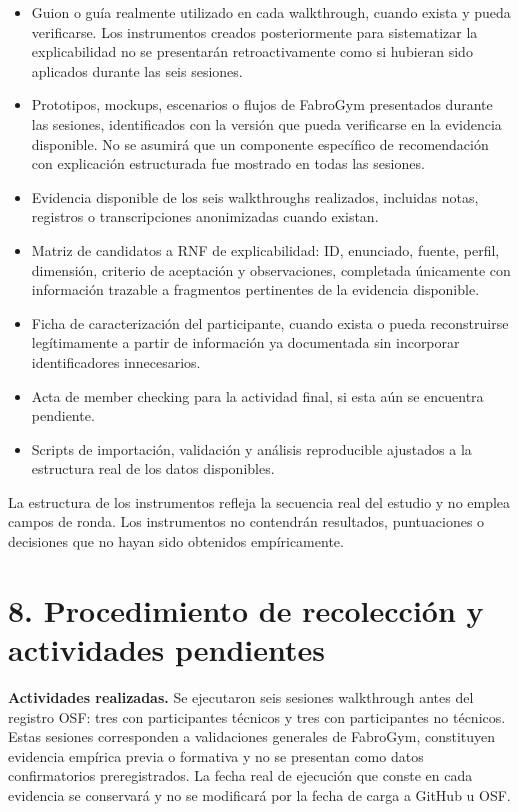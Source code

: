 \documentclass[9pt,a4paper]{extarticle}
\begin{document}
\begin{itemize}
\item Guion o guía realmente utilizado en cada walkthrough, cuando exista y pueda verificarse. Los instrumentos creados posteriormente para sistematizar la explicabilidad no se presentarán retroactivamente como si hubieran sido aplicados durante las seis sesiones.
\item Prototipos, mockups, escenarios o flujos de FabroGym presentados durante las sesiones, identificados con la versión que pueda verificarse en la evidencia disponible. No se asumirá que un componente específico de recomendación con explicación estructurada fue mostrado en todas las sesiones.
\item Evidencia disponible de los seis walkthroughs realizados, incluidas notas, registros o transcripciones anonimizadas cuando existan.
\item Matriz de candidatos a RNF de explicabilidad: ID, enunciado, fuente, perfil, dimensión, criterio de aceptación y observaciones, completada únicamente con información trazable a fragmentos pertinentes de la evidencia disponible.
\item Ficha de caracterización del participante, cuando exista o pueda reconstruirse legítimamente a partir de información ya documentada sin incorporar identificadores innecesarios.
\item Acta de member checking para la actividad final, si esta aún se encuentra pendiente.
\item Scripts de importación, validación y análisis reproducible ajustados a la estructura real de los datos disponibles.
\end{itemize}

La estructura de los instrumentos refleja la secuencia real del estudio y no emplea campos de ronda. Los instrumentos no contendrán resultados, puntuaciones o decisiones que no hayan sido obtenidos empíricamente.

\section*{8. Procedimiento de recolección y actividades pendientes}

\textbf{Actividades realizadas.} Se ejecutaron seis sesiones walkthrough antes del registro OSF: tres con participantes técnicos y tres con participantes no técnicos. Estas sesiones corresponden a validaciones generales de FabroGym, constituyen evidencia empírica previa o formativa y no se presentan como datos confirmatorios preregistrados. La fecha real de ejecución que conste en cada evidencia se conservará y no se modificará por la fecha de carga a GitHub u OSF.
\end{document}
